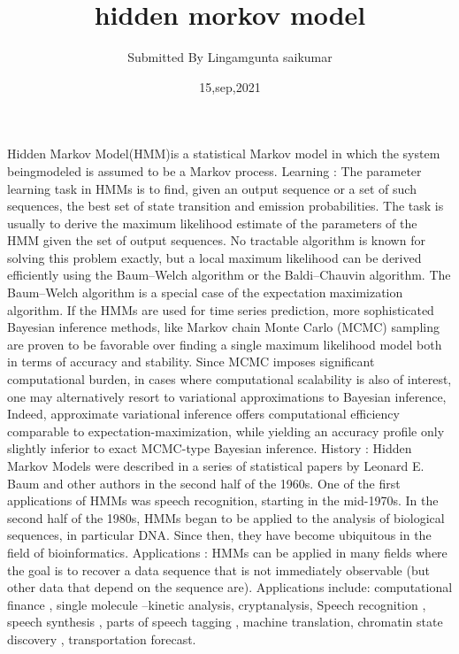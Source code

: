 \documentclass{article}
\title{hidden morkov model}
\author{Submitted By Lingamgunta saikumar}
\date{15,sep,2021}
\begin{document}
\maketitle

\section{}
Hidden Markov Model(HMM)is a statistical Markov model in which the system 
beingmodeled is assumed to be a Markov process. 
Learning :
The parameter learning task in HMMs is to find, given an output sequence or a set of such 
sequences, the best set of state transition and emission probabilities. The task is usually to 
derive the maximum likelihood estimate of the parameters of the HMM given the set of 
output sequences. No tractable algorithm is known for solving this problem exactly, but a 
local maximum likelihood can be derived efficiently using the Baum–Welch algorithm or the 
Baldi–Chauvin algorithm. The Baum–Welch algorithm is a special case of the expectationmaximization algorithm. If the HMMs are used for time series prediction, more 
sophisticated Bayesian inference methods, like Markov chain Monte Carlo (MCMC) sampling 
are proven to be favorable over finding a single maximum likelihood model both in terms of 
accuracy and stability. Since MCMC imposes significant computational burden, in cases 
where computational scalability is also of interest, one may alternatively resort to 
variational approximations to Bayesian inference, Indeed, approximate variational inference 
offers computational efficiency comparable to expectation-maximization, while yielding an 
accuracy profile only slightly inferior to exact MCMC-type Bayesian inference.
History :
Hidden Markov Models were described in a series of statistical papers by Leonard E. Baum 
and other authors in the second half of the 1960s. One of the first applications of HMMs 
was speech recognition, starting in the mid-1970s.
In the second half of the 1980s, HMMs began to be applied to the analysis of biological 
sequences, in particular DNA. Since then, they have become ubiquitous in the field of 
bioinformatics.
Applications :
HMMs can be applied in many fields where the goal is to recover a data sequence that is not 
immediately observable (but other data that depend on the sequence are).
Applications include: computational finance , single molecule –kinetic analysis,
cryptanalysis,
Speech recognition , speech synthesis , parts of speech tagging , machine translation, 
chromatin state discovery , transportation forecast.
\end{document}
